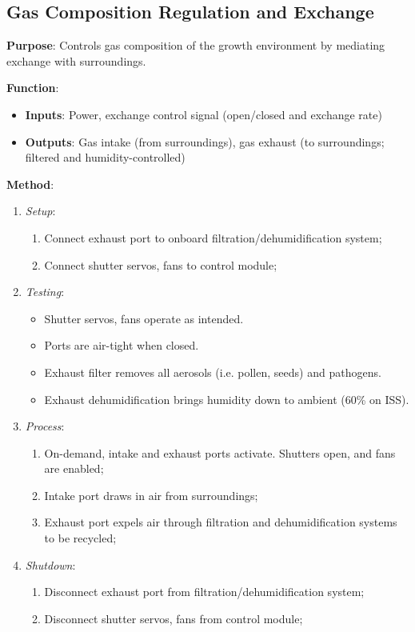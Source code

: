 \subsection{Gas Composition Regulation and Exchange}
\label{sec:gas}

\textbf{Purpose}: Controls gas composition of the growth environment by mediating exchange with surroundings.

\textbf{Function}:
\begin{itemize}
    \item \textbf{Inputs}: Power, exchange control signal (open/closed and exchange rate)
    \item \textbf{Outputs}: Gas intake (from surroundings), gas exhaust (to surroundings; filtered and humidity-controlled)
\end{itemize}

\textbf{Method}:
\begin{enumerate}
    \item \textit{Setup}:
    \begin{enumerate}
        \item Connect exhaust port to onboard filtration/dehumidification system;
        \item Connect shutter servos, fans to control module;
    \end{enumerate}
    \item \textit{Testing}:
    \begin{itemize}
        \item Shutter servos, fans operate as intended.
        \item Ports are air-tight when closed.
        \item Exhaust filter removes all aerosols (i.e. pollen, seeds) and pathogens.
        \item Exhaust dehumidification brings humidity down to ambient (60\% on ISS). %
    \end{itemize}
    \item \textit{Process}:
    \begin{enumerate}
        \item On-demand, intake and exhaust ports activate. Shutters open, and fans are enabled;
        \item Intake port draws in air from surroundings;
        \item Exhaust port expels air through filtration and dehumidification systems to be recycled;
    \end{enumerate}
    \item \textit{Shutdown}:
    \begin{enumerate}
        \item Disconnect exhaust port from filtration/dehumidification system;
        \item Disconnect shutter servos, fans from control module;
    \end{enumerate}
\end{enumerate}

